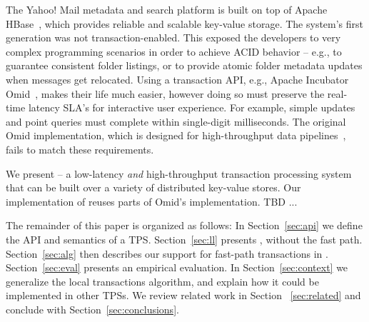 The Yahoo! Mail metadata and search platform is built on top of Apache HBase~\cite{hbase}, 
which provides reliable and scalable key-value storage. The system's first generation was not 
transaction-enabled. This exposed the developers to very complex programming scenarios in 
order to achieve ACID behavior -- e.g., to guarantee consistent folder listings, or to provide 
atomic folder metadata updates when messages get relocated. Using a transaction API, e.g.,  
Apache Incubator Omid~\cite{omid}, makes their life much easier, however doing so 
must preserve the real-time latency SLA's for interactive user experience. For example, 
simple updates and point queries must complete within single-digit milliseconds. The original 
Omid implementation, which is designed for high-throughput data pipelines~\cite{Omid2017}, 
fails to match these requirements. %

We present \sys -- a low-latency {\em and\/} high-throughput transaction processing system
that can be built over a variety of distributed key-value stores. Our implementation of \sys 
reuses parts of Omid's implementation. TBD ... 

The remainder of this paper is organized as follows:
In Section~\ref{sec:api} we define the  API and semantics of a TPS. 
Section~\ref{sec:ll} presents \sys, without the fast path. 
Section~\ref{sec:alg} then describes our support for fast-path  transactions in \sys.  
Section~\ref{sec:eval} presents an empirical evaluation.
In Section~\ref{sec:context} we generalize the local transactions algorithm, and explain how it could be implemented in 
other TPSs. 
 We review related work in Section ~\ref{sec:related} and conclude with Section~\ref{sec:conclusions}.
